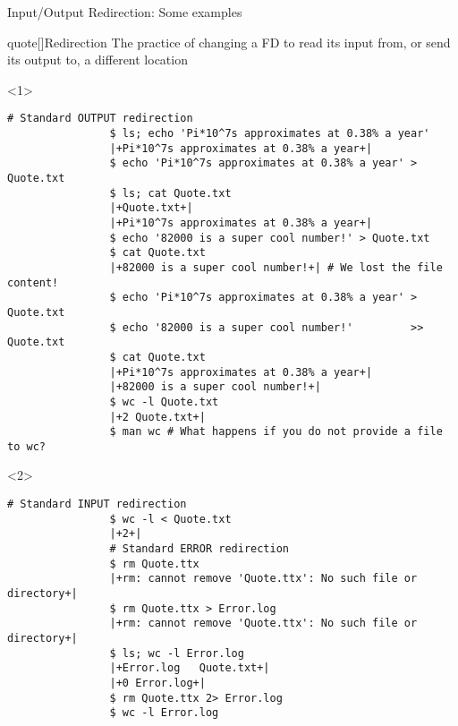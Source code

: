 \begin{frame}[fragile]{Input/Output Redirection: Some examples}
    \vspace{-8mm}
    \begin{overlayarea}{\textwidth}{0.7\textheight}
        \begin{varblock}{quote}[\textwidth]{Redirection}
            \normalsize\textnormal{The practice of changing a FD to read its input from, or send its output to, a different location}
        \end{varblock}
        \begin{onlyenv}<1>
            \begin{lstlisting}[style=MyBash, aboveskip=2mm]
                # Standard OUTPUT redirection
                $ ls; echo 'Pi*10^7s approximates at 0.38% a year'
                |+Pi*10^7s approximates at 0.38% a year+|
                $ echo 'Pi*10^7s approximates at 0.38% a year' > Quote.txt
                $ ls; cat Quote.txt
                |+Quote.txt+|
                |+Pi*10^7s approximates at 0.38% a year+|
                $ echo '82000 is a super cool number!' > Quote.txt
                $ cat Quote.txt
                |+82000 is a super cool number!+| # We lost the file content!
                $ echo 'Pi*10^7s approximates at 0.38% a year' >  Quote.txt
                $ echo '82000 is a super cool number!'         >> Quote.txt
                $ cat Quote.txt
                |+Pi*10^7s approximates at 0.38% a year+|
                |+82000 is a super cool number!+|
                $ wc -l Quote.txt
                |+2 Quote.txt+|
                $ man wc # What happens if you do not provide a file to wc?
            \end{lstlisting}
        \end{onlyenv}
        \begin{onlyenv}<2>
            \begin{lstlisting}[style=MyBash, aboveskip=2mm, firstnumber=19]
                # Standard INPUT redirection
                $ wc -l < Quote.txt
                |+2+|
                # Standard ERROR redirection
                $ rm Quote.ttx
                |+rm: cannot remove 'Quote.ttx': No such file or directory+|
                $ rm Quote.ttx > Error.log
                |+rm: cannot remove 'Quote.ttx': No such file or directory+|
                $ ls; wc -l Error.log
                |+Error.log   Quote.txt+|
                |+0 Error.log+|
                $ rm Quote.ttx 2> Error.log
                $ wc -l Error.log

\end{lstlisting}
\end{onlyenv}
\end{overlayarea}
\end{frame}
